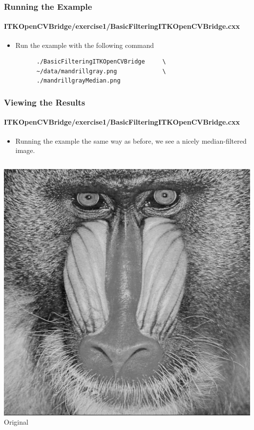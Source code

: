 \begin{frame}[fragile]
\frametitle{Running the Example}
\framesubtitle{ITKOpenCVBridge/exercise1/BasicFilteringITKOpenCVBridge.cxx}
\begin{itemize}
\item Run the example with the following command
\begin{verbatim}
      ./BasicFilteringITKOpenCVBridge     \
      ~/data/mandrillgray.png             \
      ./mandrillgrayMedian.png 
\end{verbatim}
\end{itemize}
\end{frame}

\begin{frame}
\frametitle{Viewing the Results}
\framesubtitle{ITKOpenCVBridge/exercise1/BasicFilteringITKOpenCVBridge.cxx}
\begin{itemize}
\item Running the example the same way as before, we see a nicely
median-filtered image.
\end{itemize}
\begin{columns}[c]
\begin{center}
\includegraphics[width=1\textwidth]{../Art/mandrilgray.png} \\
Original
\end{center}

\end{columns}
\end{frame}

